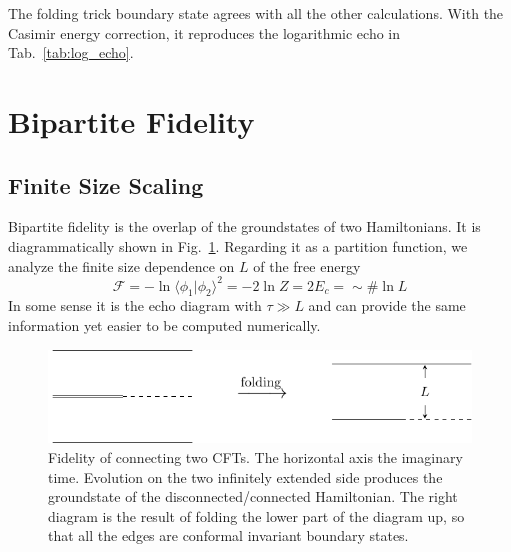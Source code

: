\documentclass{article}
\begin{document}
The folding trick boundary state agrees with all the other calculations. With the Casimir energy correction, it reproduces the logarithmic echo in Tab.~\ref{tab:log_echo}. 



\section{Bipartite Fidelity}
\subsection{Finite Size Scaling}

Bipartite fidelity is the overlap of the groundstates of two Hamiltonians. It is diagrammatically shown in Fig.~\ref{fig:fidel}. Regarding it as a partition function, we analyze the finite size dependence on $L$ of the free energy
\begin{equation}
\mathcal{F} = - \ln \langle \phi_1 |\phi_2 \rangle^2 = - 2 \ln Z   = 2 E_c = \sim \# \ln L 
\end{equation}
In some sense it is the echo diagram with $\tau \gg L$ and can provide the same information yet easier to be computed numerically. 

\begin{figure}[h]
\centering
\includegraphics[width=\textwidth]{fig_fidel}
\caption{Fidelity of connecting two CFTs. The horizontal axis the imaginary time. Evolution on the two infinitely extended side produces the groundstate of the disconnected/connected Hamiltonian. The right diagram is the result of folding the lower part of the diagram up, so that all the edges are conformal invariant boundary states.}
\label{fig:fidel}
\end{figure}
\end{document}
